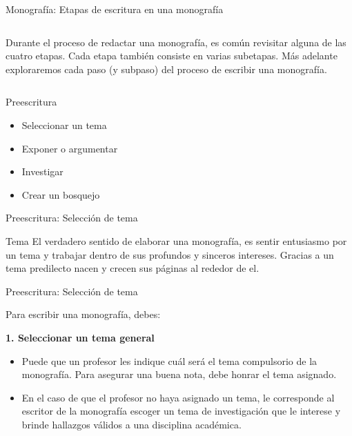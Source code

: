 \documentclass[
11pt, %
]{beamer}
\begin{document}
\begin{frame}{Monografía: Etapas de escritura en una monografía}

	\begin{columns}[T]
		\centering

		Durante el proceso de redactar una monografía, es común revisitar alguna de las
		cuatro etapas. Cada etapa también consiste en varias subetapas. Más adelante
		exploraremos cada paso (y subpaso) del proceso de escribir una monografía.
	\end{columns}

\end{frame}

\begin{frame}{Preescritura}
	\begin{itemize}
		\item Seleccionar un tema
		\item Exponer o argumentar
		\item Investigar
		\item Crear un bosquejo
	\end{itemize}
\end{frame}

\begin{frame}{Preescritura: Selección de tema}

	\begin{block}{Tema}
		El verdadero sentido de elaborar una monografía, es sentir entusiasmo por un tema y trabajar dentro de sus profundos y sinceros intereses. Gracias a un tema predilecto nacen y crecen sus páginas al rededor de el.
	\end{block}

\end{frame}

\begin{frame}{Preescritura: Selección de tema}

	Para escribir una monografía, debes:

	\textbf{1. Seleccionar un tema general}
	\begin{itemize}
		\item Puede que un profesor les indique cuál será el tema compulsorio de la monografía. Para asegurar una buena nota, debe honrar el tema asignado.
		\item En el caso de que el profesor no haya asignado un tema, le corresponde al escritor de la monografía escoger un tema de investigación que le interese y brinde hallazgos válidos a una disciplina académica.
	\end{itemize}

\end{frame}
\end{document}
